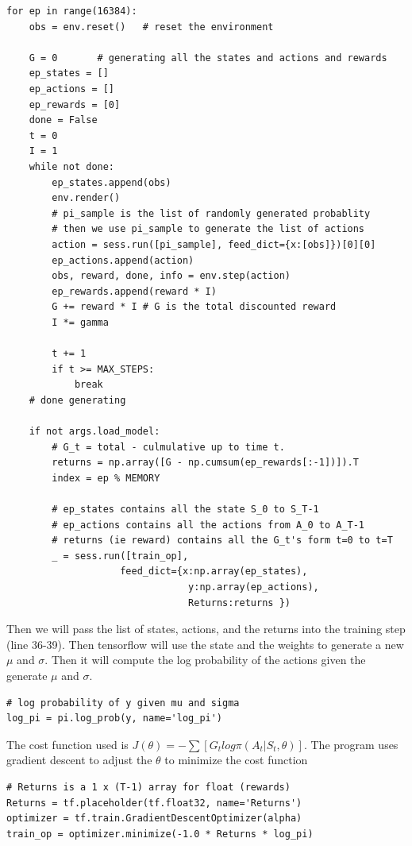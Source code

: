 \documentclass[11pt,twoside]{article}
\begin{document}
\begin{lstlisting}
for ep in range(16384):
    obs = env.reset()	# reset the environment

    G = 0	    # generating all the states and actions and rewards
    ep_states = []
    ep_actions = []
    ep_rewards = [0]
    done = False
    t = 0
    I = 1
    while not done:
        ep_states.append(obs)
        env.render()
        # pi_sample is the list of randomly generated probablity
        # then we use pi_sample to generate the list of actions
        action = sess.run([pi_sample], feed_dict={x:[obs]})[0][0]
        ep_actions.append(action)
        obs, reward, done, info = env.step(action)
        ep_rewards.append(reward * I)
        G += reward * I # G is the total discounted reward
        I *= gamma

        t += 1
        if t >= MAX_STEPS:
            break
    # done generating

    if not args.load_model:
        # G_t = total - culmulative up to time t. 
        returns = np.array([G - np.cumsum(ep_rewards[:-1])]).T
        index = ep % MEMORY
        
        # ep_states contains all the state S_0 to S_T-1
        # ep_actions contains all the actions from A_0 to A_T-1
        # returns (ie reward) contains all the G_t's form t=0 to t=T
        _ = sess.run([train_op],
                    feed_dict={x:np.array(ep_states),
                                y:np.array(ep_actions),
                                Returns:returns })
\end{lstlisting}

Then we will pass the list of states, actions, and the returns into the training step (line 36-39). Then tensorflow will use the state and the weights to generate a new $\mu$ and $\sigma$. Then it will compute the log probability of the actions given the generate $\mu$ and $\sigma$. 

\begin{lstlisting}
# log probability of y given mu and sigma
log_pi = pi.log_prob(y, name='log_pi')
\end{lstlisting}

The cost function used is $J(\theta) = -\sum[G_t log \pi (A_t | S_t, \theta)]$. The program uses gradient descent to adjust the $\theta$ to minimize the cost function

\begin{lstlisting}
# Returns is a 1 x (T-1) array for float (rewards)
Returns = tf.placeholder(tf.float32, name='Returns')
optimizer = tf.train.GradientDescentOptimizer(alpha)
train_op = optimizer.minimize(-1.0 * Returns * log_pi)
\end{lstlisting}
\end{document}
